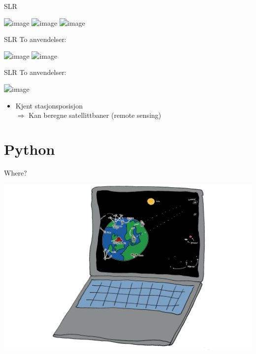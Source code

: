 \documentclass[12pt,table,t]{beamer}
\begin{document}
\begin{frame}[c]{SLR}
  \begin{center}
    \includegraphics<1>[width=\textwidth]{figure/slr_concept_01}
    \includegraphics<2>[width=\textwidth]{figure/slr_concept_02}
    \includegraphics<3>[width=\textwidth]{figure/slr_concept_03}
  \end{center}
\end{frame}


\begin{frame}[c]{SLR}
  To anvendelser:

  \begin{center}
    \includegraphics<1>[width=\textwidth]{figure/lageos_01}
    \includegraphics<2>[width=\textwidth]{figure/lageos_02}
  \end{center}

\end{frame}


\begin{frame}[c]{SLR}
  To anvendelser:

    \begin{center}
    \includegraphics<1>[width=0.7\textwidth]{figure/altimetry_06}
  \end{center}

  \begin{itemize}
  \item Kjent stasjonsposisjon\\
    $\Rightarrow$ Kan beregne satellittbaner (remote sensing)
  \end{itemize}
\end{frame}


\part{Python}


\begin{frame}[c]{Where?}
  \begin{center}
    \includegraphics[width=\textwidth]{figure/where}
  \end{center}
\end{frame}
\end{document}
